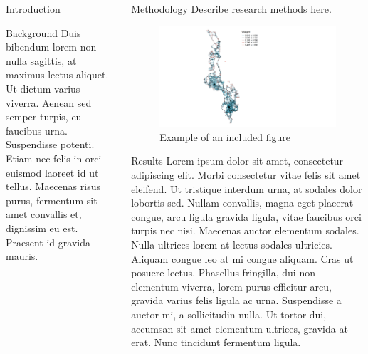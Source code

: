 \documentclass[final]{beamer}
\begin{document}
\begin{frame}[t]
\begin{columns}[t]
\begin{column}{.30\textwidth}
\begin{block}{Introduction}
\end{block}

\begin{block}{Background}
  Duis bibendum lorem non nulla sagittis, at maximus lectus aliquet. Ut dictum varius viverra. Aenean sed semper turpis, eu faucibus urna. Suspendisse potenti. Etiam nec felis in orci euismod laoreet id ut tellus. Maecenas risus purus, fermentum sit amet convallis et, dignissim eu est. Praesent id gravida mauris. 
\end{block}
\end{column}

\begin{column}{.30\textwidth}
\begin{block}{Methodology}
  Describe research methods here.

  \vspace*{0.75in}

      \begin{figure}
        \centering
        \includegraphics[width=\textwidth]{images/figures/map_network_gauss.png}
        \caption{Example of an included figure}
        \label{fig:example_fig}
    \end{figure}
    
\end{block}



\begin{block}{Results}
  Lorem ipsum dolor sit amet, consectetur adipiscing elit. Morbi consectetur vitae felis sit amet eleifend. Ut tristique interdum urna, at sodales dolor lobortis sed. Nullam convallis, magna eget placerat congue, arcu ligula gravida ligula, vitae faucibus orci turpis nec nisi. Maecenas auctor elementum sodales. Nulla ultrices lorem at lectus sodales ultricies. Aliquam congue leo at mi congue aliquam. Cras ut posuere lectus. Phasellus fringilla, dui non elementum viverra, lorem purus efficitur arcu, gravida varius felis ligula ac urna. Suspendisse a auctor mi, a sollicitudin nulla. Ut tortor dui, accumsan sit amet elementum ultrices, gravida at erat. Nunc tincidunt fermentum ligula.
\end{block}
\end{column}


\end{columns}
\end{frame}
\end{document}
